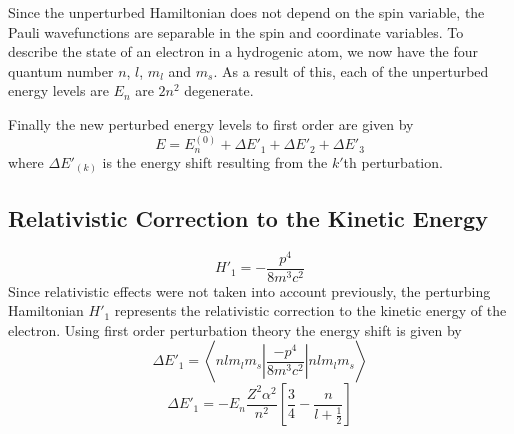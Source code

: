 \documentclass[a4paper]{serif}
\begin{document}
    Since the unperturbed Hamiltonian does not depend on the spin variable, the
    Pauli wavefunctions are separable in the spin and coordinate variables.
    To describe the state of an electron in a hydrogenic atom, we now have the four
    quantum number $n$, $l$, $m_l$ and $m_s$. As a result of this, each of the
    unperturbed energy levels are $E_n$ are $2n^2$ degenerate.

    Finally the new perturbed energy levels to first order are given by
    \begin{displaymath}
        E = E_{n}^{(0)} + \Delta E'_1 + \Delta E'_2 + \Delta E'_3
    \end{displaymath}
    where $\Delta E'_{(k)}$ is the energy shift resulting from the $k'$th perturbation.
    
	\subsection{Relativistic Correction to the Kinetic Energy}
	\begin{displaymath}
		H'_1 = - \frac{p^4}{8m^3c^2}
	\end{displaymath}
    Since relativistic effects were not taken into account previously, the 
    perturbing Hamiltonian $H'_1$ represents the relativistic correction
    to the kinetic energy of the electron.
    Using first order perturbation theory the energy shift is given by
    \begin{displaymath} 
        \Delta E'_1 = \left \langle nl m_l m_s 
                        \left|
                            \frac{-p^4}{8m^3 c^2} 
                        \right|
                      nl m_l m_s \right \rangle 
    \end{displaymath}
    \begin{displaymath}
        \Delta E'_1 = -E_n \frac{Z^2 \alpha^2}{n^2} 
                        \left[ \frac{3}{4}  - \frac{n}{l + \frac{1}{2}} \right]
    \end{displaymath}
\end{document}
